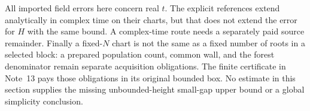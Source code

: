 All imported field errors here concern real $t$. The explicit references
extend analytically in complex time on their charts, but that does not extend
the error for $H$ with the same bound. A complex-time route needs a separately
paid source remainder. Finally a fixed-$N$ chart is not the same as a fixed
number of roots in a selected block: a prepared population count, common wall,
and the forest denominator remain separate acquisition obligations. The finite
certificate in Note~13 pays those obligations in its original bounded box.
No estimate in this section supplies the missing unbounded-height small-gap
upper bound or a global simplicity conclusion.
